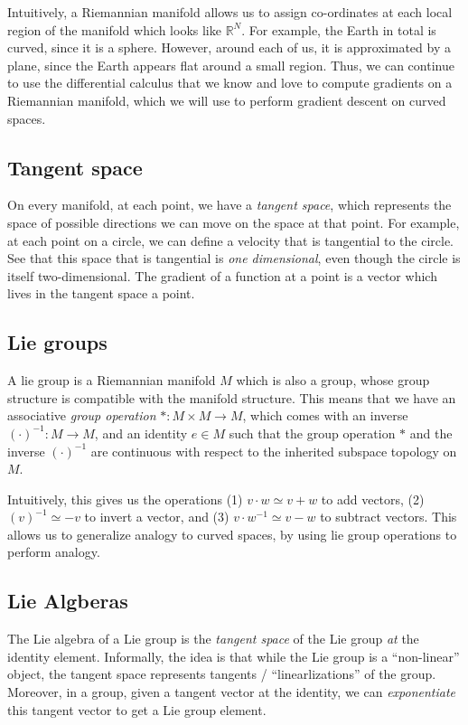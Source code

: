 \documentclass[11pt]{book}
\newcommand{\R}{\ensuremath{\mathbb R}}
\begin{document}
Intuitively, a Riemannian manifold allows us to assign co-ordinates at each
local region of the manifold which looks like $\R^N$. For example, the Earth in
total is curved, since it is a sphere. However, around each of us, it is
approximated by a plane, since the Earth appears flat around a small region.
Thus, we can continue to use the differential calculus that we know and love to
compute gradients on a Riemannian manifold, which we will use to perform gradient
descent on curved spaces.

\subsection{Tangent space}
On every manifold, at each point, we have a \emph{tangent space}, which
represents the space of possible directions we can move on the space at that
point. For example, at each point on a circle, we can define a velocity that is
tangential to the circle. See that this space that is tangential is \emph{one dimensional},
even though the circle is itself two-dimensional. The gradient of a function at a point is a
vector which lives in the tangent space a point.



\subsection{Lie groups}
A lie group is a Riemannian manifold $M$ which is also a group, whose group
structure is compatible with the manifold structure. This means that we have
an associative \emph{group operation} $*: M \times M \rightarrow M$, which comes with an
inverse $(\cdot)^{-1} : M \rightarrow M$, and an identity $e \in M$ such that the group operation $*$
and the inverse $(\cdot)^{-1}$ are continuous with respect to the inherited
subspace topology on $M$.

Intuitively, this gives us the operations (1) $v \cdot w \simeq v + w$ to add
vectors, (2)  $(v)^{-1} \simeq -v$ to invert a vector, and (3) $v \cdot w^{-1} \simeq v - w$
to subtract vectors. This allows us to generalize analogy to curved spaces, by using
lie group operations to perform analogy.



\subsection{Lie Algberas}
The Lie algebra of a Lie group is the \emph{tangent space} of the Lie group
\emph{at} the identity element. Informally, the idea is that while the Lie group is a
``non-linear'' object, the tangent space represents tangents / ``linearlizations'' of the group.
Moreover, in a group, given a tangent vector at the identity, we can \emph{exponentiate} this
tangent vector to get a Lie group element.
\end{document}
